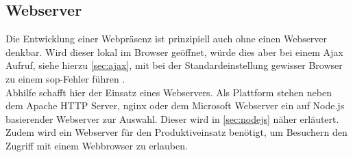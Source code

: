\subsection{Webserver}
\label{sec:webserver}
Die Entwicklung einer Webpräsenz ist prinzipiell auch ohne einen Webserver denkbar. Wird dieser lokal im Browser geöffnet, würde dies aber bei einem Ajax Aufruf, siehe hierzu \autoref{sec:ajax}, mit bei der Standardeinstellung gewisser Browser zu einem \ac{sop}-Fehler führen \cite[S. 45  f.]{ste15}.\\
Abhilfe schafft hier der Einsatz eines Webservers. Als Plattform stehen neben dem Apache HTTP Server, nginx oder dem Microsoft Webserver ein auf Node.js basierender Webserver zur Auswahl. Dieser wird in \autoref{sec:nodejs} näher erläutert. \\
Zudem wird ein Webserver für den Produktiveinsatz benötigt, um Besuchern den Zugriff mit einem Webbrowser zu erlauben.